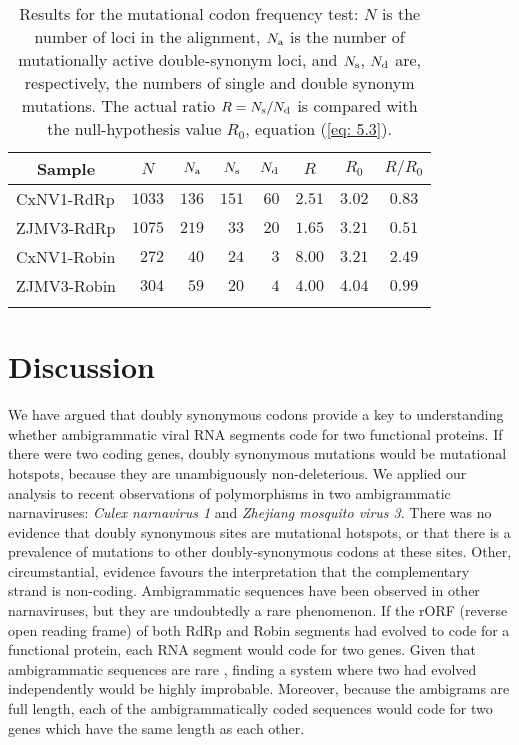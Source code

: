 \documentclass[unnumsec,webpdf,contemporary,large]{oup-authoring-template}%
\theoremstyle{thmstyleone}%
\theoremstyle{thmstyletwo}%
\theoremstyle{thmstylethree}%
\begin{document}
\begin{table}
\caption{Results for the mutational codon frequency test: $N$ is the number of loci
in the alignment, $N_{\rm a}$ is the number of mutationally active double-synonym loci, and
$N_{\rm s}$, $N_{\rm d}$ are, respectively, the numbers of single and double synonym mutations.
The actual ratio $R=N_{\rm s}/N_{\rm d}$ is compared with the null-hypothesis value
$R_0$, equation (\ref{eq: 5.3}).
\label{tab: 5.5}}
\begin{tabular*}{\columnwidth}{@{\extracolsep\fill}lrrrrccc@{\extracolsep\fill}}
\toprule
\multicolumn{1}{c}{Sample}&\multicolumn{1}{c}{$N$}&\multicolumn{1}{c}{$N_{\rm a}$}&\multicolumn{1}{c}{$N_{\rm s}$}&\multicolumn{1}{c}{$N_{\rm d}$}&$R$&$R_0$&$R/R_0$\\
\midrule
CxNV1-RdRp  &$1033$&$136$&$151$&$60$&$2.51$&$3.02$&$0.83$\\
ZJMV3-RdRp  &$1075$&$219$&$33$&$20$&$1.65$&$3.21$&$0.51$\\
CxNV1-Robin  &$272$&$40$&$24$&$3$&$8.00$&$3.21$&$2.49$\\
ZJMV3-Robin  &$304$&$59$&$20$&$4$&$4.00$&$4.04$&$0.99$\\
\botrule
\end{tabular*}
\end{table}

\section{Discussion}
\label{sec: 6}

We have argued that doubly synonymous codons provide a key to understanding whether
ambigrammatic viral RNA segments code for two functional proteins. If there were two
coding genes, doubly synonymous mutations would be mutational hotspots,
because they are unambiguously non-deleterious. We applied our analysis to recent
observations of polymorphisms in two ambigrammatic narnaviruses: \emph{Culex narnavirus 1}
and \emph{Zhejiang mosquito virus 3}. There was no evidence that doubly synonymous
sites are mutational hotspots, or that there is a prevalence of mutations to other doubly-synonymous codons
at these sites. Other, circumstantial, evidence favours the interpretation that the complementary strand is non-coding.
Ambigrammatic sequences have been observed in other narnaviruses,
but they are undoubtedly a rare phenomenon.
If the rORF (reverse open reading frame) of both RdRp and Robin segments
had evolved to code for a functional protein, each RNA segment would code for two genes.
Given that ambigrammatic sequences are rare \citep{DeR+19}, finding a system where two had evolved
independently would be highly improbable. Moreover, because the ambigrams are full length,
each of the ambigrammatically coded sequences would code for two genes which have the same
length as each other.
\end{document}
